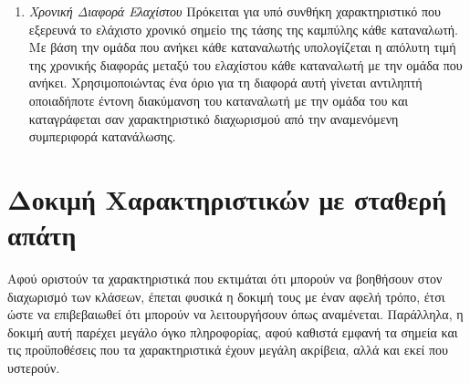 \documentclass[a4paper, 11pt]{article}
\begin{document}
\begin{enumerate}
\begin{center}
\end{center}
\item{\textit{Χρονική Διαφορά Ελαχίστου}} Πρόκειται για υπό συνθήκη χαρακτηριστικό που εξερευνά το ελάχιστο χρονικό σημείο της τάσης της καμπύλης κάθε καταναλωτή. Με βάση την ομάδα που ανήκει κάθε καταναλωτής υπολογίζεται η απόλυτη τιμή της χρονικής διαφοράς μεταξύ του ελαχίστου κάθε καταναλωτή με την ομάδα που ανήκει. Χρησιμοποιώντας ένα όριο για τη διαφορά αυτή γίνεται αντιληπτή οποιαδήποτε έντονη διακύμανση του καταναλωτή με την ομάδα του και καταγράφεται σαν χαρακτηριστικό διαχωρισμού από την αναμενόμενη συμπεριφορά κατανάλωσης.
\begin{center}
\end{center}
\end{enumerate}

\section{Δοκιμή Χαρακτηριστικών με σταθερή απάτη}
Αφού οριστούν τα χαρακτηριστικά που εκτιμάται ότι μπορούν να βοηθήσουν στον διαχωρισμό των κλάσεων, έπεται φυσικά η δοκιμή τους με έναν αφελή τρόπο, έτσι ώστε να επιβεβαιωθεί ότι μπορούν να λειτουργήσουν όπως αναμένεται. Παράλληλα, η δοκιμή αυτή παρέχει μεγάλο όγκο πληροφορίας, αφού καθιστά εμφανή τα σημεία και τις προϋποθέσεις που τα χαρακτηριστικά έχουν μεγάλη ακρίβεια, αλλά και εκεί που υστερούν.
\end{document}
